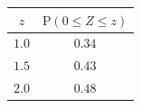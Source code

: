{\setlength{\tabcolsep}{4pt}\renewcommand{\arraystretch}{1.3}\small%
\begin{tabular}{|c|c|}
\hline
$z$ & $\mathrm{P}(0\le Z\le z)$ \\
\hline
$1.0$ & $0.34$ \\
\hline
$1.5$ & $0.43$ \\
\hline
$2.0$ & $0.48$ \\
\hline
\end{tabular}}
